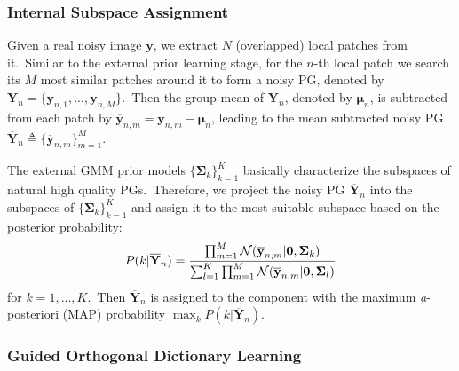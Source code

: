 \documentclass[10pt,twocolumn,letterpaper]{article}
\begin{document}
\subsubsection{Internal Subspace Assignment}

Given a real noisy image $\mathbf{y}$, we extract $N$ (overlapped) local patches from it.\ Similar to the external prior learning stage, for the $n$-th local patch we search its $M$ most similar patches around it to form a noisy PG, denoted by $\mathbf{Y}_{n} = \{\mathbf{y}_{n,1},...,\mathbf{y}_{n,M}\}$.\ Then the group mean of $\mathbf{Y}_{n}$, denoted by $\bm{\mu}_{n}$, is subtracted from each patch by $\mathbf{\overline{y}}_{n,m}=\mathbf{y}_{n,m}-\bm{\mu}_{n}$, leading to the mean subtracted noisy PG $\mathbf{\overline{Y}}_{n}\triangleq \{\mathbf{\overline{y}}_{n,m}\}_{m=1}^{M}$.

The external GMM prior models $\{\mathbf{\Sigma}_{k}\}_{k=1}^{K}$ basically characterize the subspaces of natural high quality PGs.\ Therefore, we project the noisy PG $\mathbf{\overline{Y}}_{n}$ into the subspaces of $\{\mathbf{\Sigma}_{k}\}_{k=1}^{K}$ and assign it to the most suitable subspace based on the posterior probability:
\vspace{-2mm}
\begin{equation}\label{equ3}\vspace{-2mm}
P(k|\mathbf{\overline{Y}}_{n})=\frac{\prod_{m=1}^{M}\mathcal{N}(\mathbf{\overline{y}}_{n,m}|\mathbf{0},\mathbf{\Sigma}_{k})}{\sum_{l=1}^{K}\prod_{m=1}^{M}\mathcal{N}(\mathbf{\overline{y}}_{n,m}|\mathbf{0},\mathbf{\Sigma}_{l})}
\end{equation}
for $k=1,...,K$.\ Then $\mathbf{\overline{Y}}_{n}$ is assigned to the component with the maximum \emph{a}-posteriori (MAP) probability $\max_{k}P(k|\mathbf{\overline{Y}}_{n})$.


\subsubsection{Guided Orthogonal Dictionary Learning}
\end{document}
